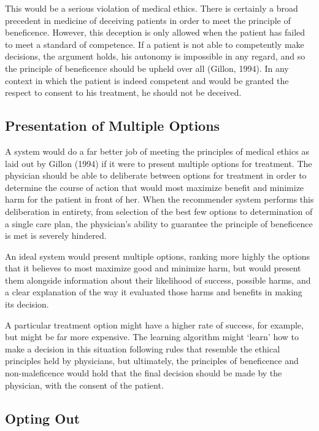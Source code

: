 \documentclass[]{spie}  %
\begin{document}
This would be a serious violation of medical ethics. There is certainly a broad precedent in medicine of deceiving patients in order to meet the principle of beneficence. However, this deception is only allowed when the patient has failed to meet a standard of competence. If a patient is not able to competently make decisions, the argument holds, his autonomy is impossible in any regard, and so the principle of beneficence should be upheld over all (Gillon, 1994). In any context in which the patient is indeed competent and would be granted the respect to consent to his treatment, he should not be deceived.

\subsection{Presentation of Multiple Options}

A system would do a far better job of meeting the principles of medical ethics as laid out by Gillon (1994) if it were to present multiple options for treatment. The physician should be able to deliberate between options for treatment in order to determine the course of action that would most maximize benefit and minimize harm for the patient in front of her. When the recommender system performs this deliberation in entirety, from selection of the best few options to determination of a single care plan, the physician’s ability to guarantee the principle of beneficence is met is severely hindered.

An ideal system would present multiple options, ranking more highly the options that it believes to most maximize good and minimize harm, but would present them alongside information about their likelihood of success, possible harms, and a clear explanation of the way it evaluated those harms and benefits in making its decision.

A particular treatment option might have a higher rate of success, for example, but might be far more expensive. The learning algorithm might ‘learn’ how to make a decision in this situation following rules that resemble the ethical principles held by physicians, but ultimately, the principles of beneficence and non-maleficence would hold that the final decision should be made by the physician, with the consent of the patient.

\subsection{Opting Out}
\end{document}
